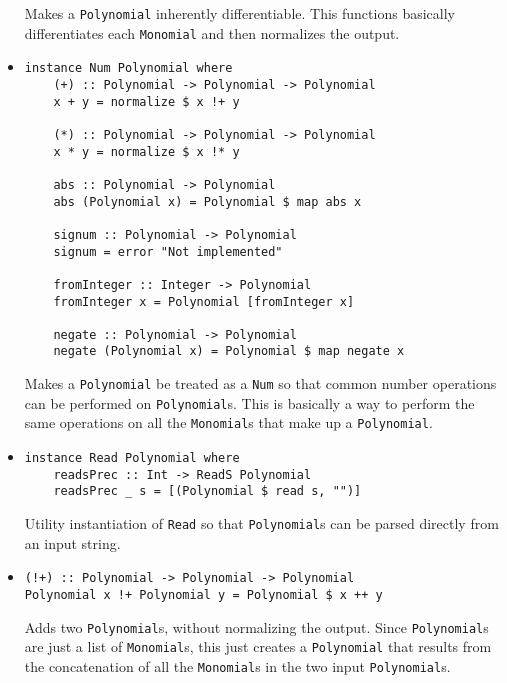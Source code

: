 \documentclass[11pt,a4paper]{article}
\begin{document}
\begin{itemize}
    Makes a \lstinline{Polynomial} inherently differentiable. This functions basically differentiates each \lstinline{Monomial} and then normalizes the output.
    
    \item \begin{lstlisting}
instance Num Polynomial where
    (+) :: Polynomial -> Polynomial -> Polynomial
    x + y = normalize $ x !+ y

    (*) :: Polynomial -> Polynomial -> Polynomial
    x * y = normalize $ x !* y
    
    abs :: Polynomial -> Polynomial
    abs (Polynomial x) = Polynomial $ map abs x
    
    signum :: Polynomial -> Polynomial
    signum = error "Not implemented"
    
    fromInteger :: Integer -> Polynomial
    fromInteger x = Polynomial [fromInteger x]
    
    negate :: Polynomial -> Polynomial
    negate (Polynomial x) = Polynomial $ map negate x
    \end{lstlisting}

    Makes a \lstinline{Polynomial} be treated as a \lstinline{Num} so that common number operations can be performed on \lstinline{Polynomial}s. This is basically a way to perform the same operations on all the \lstinline{Monomial}s that make up a \lstinline{Polynomial}.

    \item \begin{lstlisting}
instance Read Polynomial where
    readsPrec :: Int -> ReadS Polynomial
    readsPrec _ s = [(Polynomial $ read s, "")]
    \end{lstlisting}

    Utility instantiation of \lstinline{Read} so that \lstinline{Polynomial}s can be parsed directly from an input string.

    \item \begin{lstlisting}
(!+) :: Polynomial -> Polynomial -> Polynomial
Polynomial x !+ Polynomial y = Polynomial $ x ++ y
    \end{lstlisting}

    Adds two \lstinline{Polynomial}s, without normalizing the output. Since \lstinline{Polynomial}s are just a list of \lstinline{Monomial}s, this just creates a \lstinline{Polynomial} that results from the concatenation of all the \lstinline{Monomial}s in the two input \lstinline{Polynomial}s.


\end{itemize}
\end{document}
